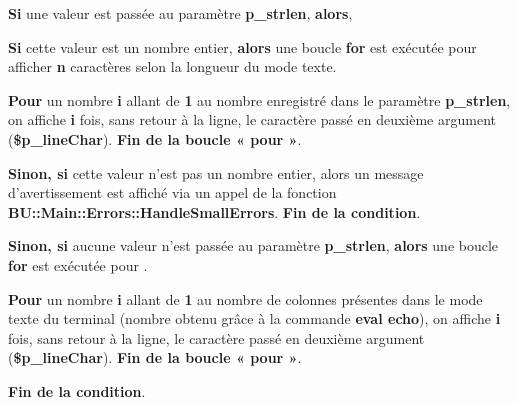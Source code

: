 \documentclass[a4paper,10pt]{article}
\begin{document}
\begin{justify}
    \textbf{\color{brick}Si} une valeur est passée au paramètre \textbf{\color{orange}p\_strlen}, \textbf{\color{brick}alors},
\end{justify}

\begin{justify}
    \textbf{\color{brick}Si} cette valeur est un nombre entier, \textbf{\color{brick}alors} une boucle \textbf{\color{cyan}for} est exécutée pour afficher \textbf{n} caractères selon la longueur du mode texte.
\end{justify}

\begin{justify}
     \textbf{\color{cyan}Pour} un nombre \textbf{\color{orange}i} allant de \textbf{\color{cyan}1} au nombre enregistré dans le paramètre \textbf{\color{orange}p\_strlen}, on affiche \textbf{\color{orange}i} fois, sans retour à la ligne, le caractère passé en deuxième argument (\textbf{\color{orange}\$p\_lineChar}). \textbf{\color{cyan}Fin de la boucle « pour »}.
\end{justify}

\begin{justify}
    \textbf{\color{brick}Sinon, si} cette valeur n'est pas un nombre entier, alors un message d'avertissement est affiché via un appel de la fonction \textbf{\color{mauve}BU::Main::Errors::HandleSmallErrors}. \textbf{\color{brick}Fin de la condition}.
\end{justify}

\begin{justify}
    \textbf{\color{brick}Sinon, si} aucune valeur n'est passée au paramètre \textbf{\color{orange}p\_strlen}, \textbf{\color{brick}alors} une boucle \textbf{\color{cyan}for} est exécutée pour .
\end{justify}

\begin{justify}
     \textbf{\color{cyan}Pour} un nombre \textbf{\color{orange}i} allant de \textbf{\color{cyan}1} au nombre de colonnes présentes dans le mode texte du terminal (nombre obtenu grâce à la commande \textbf{\color{gray}eval echo}), on affiche \textbf{\color{orange}i} fois, sans retour à la ligne, le caractère passé en deuxième argument (\textbf{\color{orange}\$p\_lineChar}). \textbf{\color{cyan}Fin de la boucle « pour »}.
\end{justify}

\begin{justify}
    \textbf{\color{brick}Fin de la condition}.
\end{justify}
\end{document}
